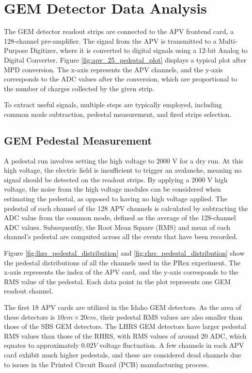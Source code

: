 \section{GEM Detector Data Analysis}

The GEM detector readout strips are connected to the APV frontend card, a 128-channel pre-amplifier. The signal from the APV is transmitted to a Multi-Purpose Digitizer, where it is converted to digital signals using a 12-bit Analog to Digital Converter. Figure \ref{fig:apv_25_pedestal_plot} displays a typical plot after MPD conversion. The x-axis represents the APV channels, and the y-axis corresponds to the ADC values after the conversion, which are proportional to the number of charges collected by the given strip.

To extract useful signals, multiple steps are typically employed, including common mode subtraction, pedestal measurement, and fired strips selection.

\subsection{GEM Pedestal Measurement}

A pedestal run involves setting the high voltage to 2000 V for a dry run. At this high voltage, the electric field is insufficient to trigger an avalanche, meaning no signal should be detected on the readout strips. By applying a 2000 V high voltage, the noise from the high voltage modules can be considered when estimating the pedestal, as opposed to having no high voltage applied. The pedestal of each channel of the 128 APV channels is calculated by subtracting the ADC value from the common mode, defined as the average of the 128-channel ADC values. Subsequently, the Root Mean Square (RMS) and mean of each channel's pedestal are computed across all the events that have been recorded.

Figure \ref{fig:lhrs_pedestal_distribution} and \ref{fig:rhrs_pedestal_distribution} show the pedestal distributions of all the channels used in the PRex experiment. The x-axis represents the index of the APV card, and the y-axis corresponds to the RMS value of the pedestal. Each data point in the plot represents one GEM readout channel.

The first 18 APV cards are utilized in the Idaho GEM detectors. As the area of these detectors is $10 cm \times 20 cm$, their pedestal RMS values are also smaller than those of the SBS GEM detectors. The LHRS GEM detectors have larger pedestal RMS values than those of the RHRS, with RMS values of around 20 ADC, which equates to approximately $0.02 V$ voltage fluctuation. A few channels in each APV card exhibit much higher pedestals, and these are considered dead channels due to issues in the Printed Circuit Board (PCB) manufacturing process.

